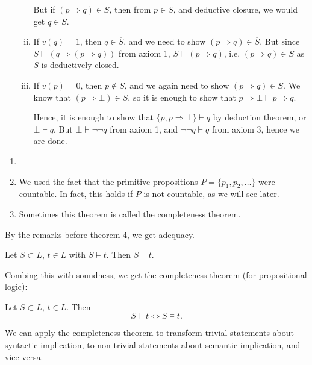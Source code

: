 \documentclass[12pt]{article}
\begin{document}
\begin{proofbox}
\begin{itemize}
\begin{enumerate}[(i)]
					But if $(p \Rightarrow q) \in \overline{S}$, then from $p \in \overline{S}$, and deductive closure, we would get $q \in \overline{S}$.
				\item If $v(q) = 1$, then $q \in \overline{S}$, and we need to show $(p \Rightarrow q) \in \overline{S}$. But since $\overline{S} \vdash (q \Rightarrow (p \Rightarrow q))$ from axiom 1, $\overline{S} \vdash (p \Rightarrow q)$, i.e. $(p \Rightarrow q) \in \overline{S}$ as $\overline{S}$ is deductively closed.
				\item If $v(p) = 0$, then $p \not \in \overline{S}$, and we again need to show $(p \Rightarrow q) \in \overline{S}$. We know that $(p \Rightarrow \bot) \in \overline{S}$, so it is enough to show that $p \Rightarrow \bot \vdash p \Rightarrow q$.

					Hence, it is enough to show that $\{p, p \Rightarrow \bot\} \vdash q$ by deduction theorem, or $\bot \vdash q$. But $\bot \vdash \neg \neg q$ from axiom 1, and $\neg \neg q \vdash q$ from axiom 3, hence we are done.
			\end{enumerate}
	\end{itemize}
\end{proofbox}

\begin{remark}
	\begin{enumerate}[1.]
		\item[]
		\item We used the fact that the primitive propositions $P = \{p_1, p_2, \ldots\}$ were countable. In fact, this holds if $P$ is not countable, as we will see later.
		\item Sometimes this theorem is called the completeness theorem.
	\end{enumerate}
\end{remark}

By the remarks before theorem 4, we get adequacy.

\begin{corollary}[Adequacy]
	Let $S \subset L$, $t \in L$ with $S \models t$. Then $S \vdash t$.
\end{corollary}

Combing this with soundness, we get the completeness theorem (for propositional logic):

\begin{theorem}
	Let $S \subset L$, $t \in L$. Then
	\[
	S \vdash t \iff S \models t
	.\]
\end{theorem}

We can apply the completeness theorem to transform trivial statements about syntactic implication, to non-trivial statements about semantic implication, and vice versa.
\end{document}
